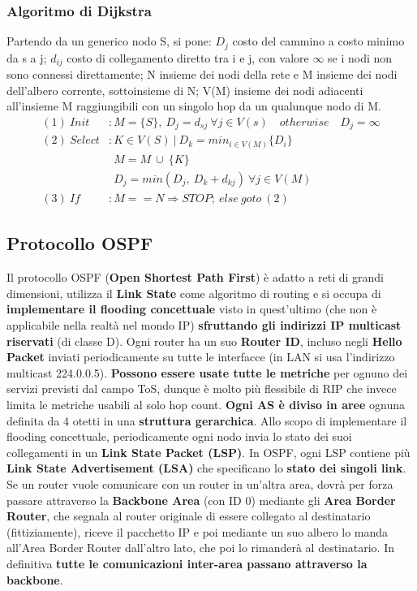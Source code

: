 \documentclass[12pt]{article}
\begin{document}
\subsubsection{Algoritmo di Dijkstra}

Partendo da un generico nodo S, si pone: $D_j$ costo del cammino a costo minimo da s a j; $d_{ij}$ costo di collegamento diretto tra i e j, con valore $\infty$ se i nodi non sono connessi direttamente; N insieme dei nodi della rete e M insieme dei nodi dell'albero corrente, sottoinsieme di N; V(M) insieme dei nodi adiacenti all'insieme M raggiungibili con un singolo hop da un qualunque nodo di M.
\begin{align*}
    (1)\ Init&: M = \{S\},\ D_j = d_{sj}\ \forall j \in V(s) \quad otherwise \quad D_j = \infty\\
    (2)\ Select&: K \in V(S)\ |\ D_k = min_{i \in V(M)}\{D_i\}\\
    &\ \ M = M\ \cup\ \{K\}\\
    &\ \ D_j = min(D_j,\ D_k + d_{kj})\ \forall j \in V(M)\\
    (3)\ If&: M == N \Rightarrow STOP;\ else\ goto\ (2)
\end{align*}

\subsection{Protocollo OSPF}

Il protocollo OSPF (\textbf{Open Shortest Path First}) è adatto a reti di grandi dimensioni, utilizza il \textbf{Link State} come algoritmo di routing e si occupa di \textbf{implementare il flooding concettuale} visto in quest'ultimo (che non è applicabile nella realtà nel mondo IP) \textbf{sfruttando gli indirizzi IP multicast riservati} (di classe D). Ogni router ha un suo \textbf{Router ID}, incluso negli \textbf{Hello Packet} inviati periodicamente su tutte le interfacce (in LAN si usa l'indirizzo multicast 224.0.0.5). \textbf{Possono essere usate tutte le metriche} per ognuno dei servizi previsti dal campo ToS, dunque è molto più flessibile di RIP che invece limita le metriche usabili al solo hop count. \textbf{Ogni AS è diviso in aree} ognuna definita da 4 otetti in una \textbf{struttura gerarchica}. Allo scopo di implementare il flooding concettuale, periodicamente ogni nodo invia lo stato dei suoi collegamenti in un \textbf{Link State Packet (LSP)}. In OSPF, ogni LSP contiene più \textbf{Link State Advertisement (LSA)} che specificano lo \textbf{stato dei singoli link}. Se un router vuole comunicare con un router in un'altra area, dovrà per forza passare attraverso la \textbf{Backbone Area} (con ID 0) mediante gli \textbf{Area Border Router}, che segnala al router originale di essere collegato al destinatario (fittiziamente), riceve il pacchetto IP e poi mediante un suo albero lo manda all'Area Border Router dall'altro lato, che poi lo rimanderà al destinatario. In definitiva \textbf{tutte le comunicazioni inter-area passano attraverso la backbone}.
\end{document}
